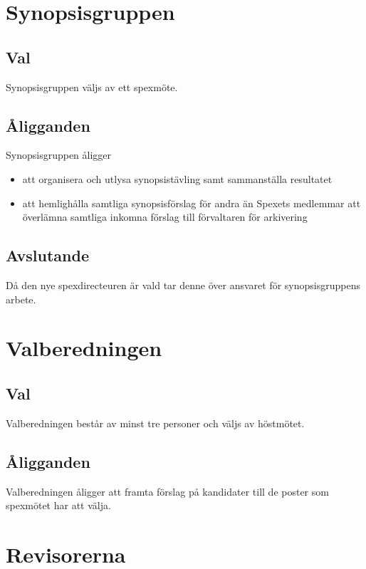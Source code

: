 \documentclass[a4paper]{article}
\begin{document}
\section{Synopsisgruppen}
\label{section:synopsisgruppen}

\subsection{Val}
Synopsisgruppen väljs av ett spexmöte.

\subsection{Åligganden}
Synopsisgruppen åligger

\begin{itemize}
  \item att organisera och utlysa synopsistävling samt sammanställa resultatet
  \item att hemlighålla samtliga synopsisförslag för andra än Spexets medlemmar att överlämna samtliga inkomna förslag till förvaltaren för arkivering
\end{itemize}

\subsection{Avslutande}
Då den nye spexdirecteuren är vald tar denne över ansvaret för synopsisgruppens arbete.

\section{Valberedningen}
\label{section:valberedningen}

\subsection{Val}
Valberedningen består av minst tre personer och väljs av höstmötet.

\subsection{Åligganden}
Valberedningen åligger att framta förslag på kandidater till de poster som spexmötet har att välja.

\section{Revisorerna}
\label{section:revisorerna}
\end{document}
